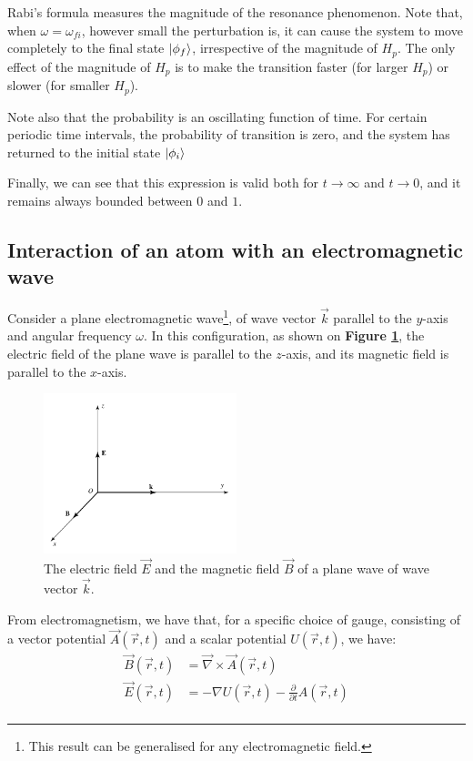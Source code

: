 Rabi's formula measures the magnitude of the resonance phenomenon. Note that, when $\omega=\omega_{fi}$, however small the perturbation is, it can cause the system to move completely to the final state $\ket{\phi_f}$, irrespective of the magnitude of $H_p$. The only effect of the magnitude of $H_p$ is to make the transition faster (for larger $H_p$) or slower (for smaller $H_p$).

Note also that the probability is an oscillating function of time. For certain periodic time intervals, the probability of transition is zero, and the system has returned to the initial state $\ket{\phi_i}$

Finally, we can see that this expression is valid both for $t\to \infty$ and $t\to 0$, and it remains always bounded between $0$ and $1$.

\subsection{Interaction of an atom with an electromagnetic wave}

Consider a plane electromagnetic wave\footnote{This result can be generalised for any electromagnetic field.}, of wave vector $\vec k$ parallel to the $y$-axis and angular frequency $\omega$. In this configuration, as shown on \textbf{Figure \ref{fig:plane_em_wave}}, the electric field of the plane wave is parallel to the $z$-axis, and its magnetic field is parallel to the $x$-axis.

\begin{figure}[htbp]
    \centering
    \includegraphics[width=0.5\textwidth]{images/plane_em_wave.png}
    \caption{The electric field $\vec{E}$ and the magnetic field $\vec B$ of a plane wave of wave vector $\vec k$.}
    \label{fig:plane_em_wave}
\end{figure}

From electromagnetism, we have that, for a specific choice of gauge, consisting of a vector potential $\vec A(\vec r, t)$ and a scalar potential $U(\vec r, t)$, we have:
\begin{equation} \label{potential_electric_magnetic}
    \begin{split}
        \vec{B}(\vec r, t) &= \vec{\nabla} \times \vec A(\vec r, t)\\
        \vec{E}(\vec r, t) &= -\nabla U(\vec r, t) - \frac{\partial}{\partial t} A(\vec r, t)\\
    \end{split}
\end{equation}

